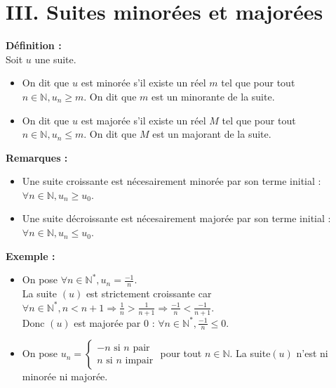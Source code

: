 \documentclass[11pt,a4paper]{article}
\begin{document}
\newpage

\section*{III. Suites minorées et majorées}

\begin{mdframed}[style=definitionStyle]
    \textbf{Définition :} ~\\
    Soit $u$ une suite.
    \vspace*{-4pt}
    \begin{itemize}
      \item On dit que $u$ est minorée s'il existe un réel $m$ tel que pour tout $n\in\mathbb{N}, u_n\geq m$.
      On dit que $m$ est un minorante de la suite.
      \item On dit que $u$ est majorée s'il existe un réel $M$ tel que pour tout $n\in\mathbb{N}, u_n\leq m$.
      On dit que $M$ est un majorant de la suite.
    \end{itemize} 
\end{mdframed}

\textbf{Remarques :}
\begin{itemize}
  \item Une suite croissante est nécesairement minorée par son terme initial : $\forall n\in\mathbb{N}, u_n\geq u_0$.
  \item Une suite décroissante est nécesairement majorée par son terme initial : $\forall n\in\mathbb{N}, u_n\leq u_0$.
\end{itemize} 

\textbf{Exemple :}
\begin{itemize}
  \item On pose $\forall n\in\mathbb{N}^*, u_n=\frac{-1}{n}$. \\
  La suite $(u)$ est strictement croissante car $\forall n\in\mathbb{N}^*, n<n+1 \Rightarrow \frac{1}{n}>\frac{1}{n+1}\Rightarrow\frac{-1}{n}<\frac{-1}{n+1}$. \\
  Donc $(u)$ est majorée par $0$ : $\forall n\in\mathbb{N}^*, \frac{-1}{n}\leq0$.
  \item On pose 
  $u_n=\left\{
  \begin{array}{l}
    -n \text{ si $n$ pair} \\
    n \text{ si $n$ impair}
  \end{array}
  \right.$ pour tout $n\in\mathbb{N}$. La suite$(u)$ n'est ni minorée ni majorée.
\end{itemize}
\end{document}
